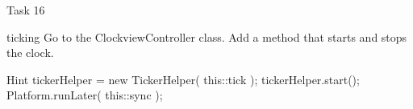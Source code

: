 \begin{frame}{Task 16}
\begin{block}{ticking}
Go to the ClockviewController class. Add a method that starts and stops the clock.
\end{block}
\pause
\begin{exampleblock}{Hint}
 tickerHelper = new TickerHelper( this::tick );
        tickerHelper.start();
        Platform.runLater( this::sync );
\end{exampleblock}
\end{frame}